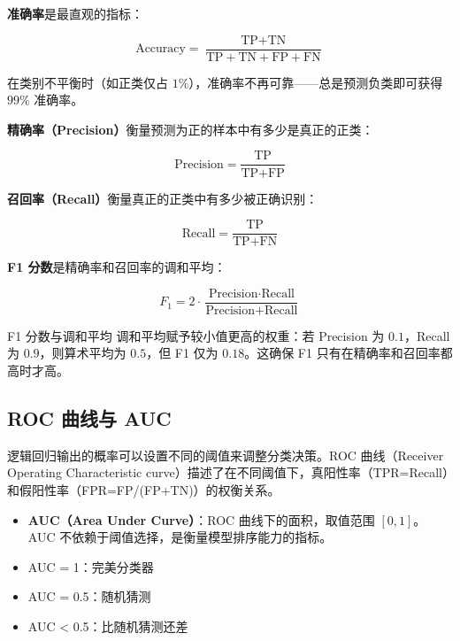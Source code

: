 \textbf{准确率}是最直观的指标：

\[
\text{Accuracy} = \frac{\text{TP} + \text{TN}}{\text{TP} + \text{TN} + \text{FP} + \text{FN}}
\]

在类别不平衡时（如正类仅占 $1\%$），准确率不再可靠——总是预测负类即可获得 $99\%$ 准确率。

\textbf{精确率（Precision）}衡量预测为正的样本中有多少是真正的正类：

\[
\text{Precision} = \frac{\text{TP}}{\text{TP} + \text{FP}}
\]

\textbf{召回率（Recall）}衡量真正的正类中有多少被正确识别：

\[
\text{Recall} = \frac{\text{TP}}{\text{TP} + \text{FN}}
\]

\textbf{F1 分数}是精确率和召回率的调和平均：

\[
F_1 = 2 \cdot \frac{\text{Precision} \cdot \text{Recall}}{\text{Precision} + \text{Recall}}
\]

\begin{myTheorem}{F1 分数与调和平均}
调和平均赋予较小值更高的权重：若 Precision 为 $0.1$，Recall 为 $0.9$，则算术平均为 $0.5$，但 F1 仅为 $0.18$。这确保 F1 只有在精确率和召回率都高时才高。
\end{myTheorem}

\subsection{ROC 曲线与 AUC}

逻辑回归输出的概率可以设置不同的阈值来调整分类决策。ROC 曲线（Receiver Operating Characteristic curve）描述了在不同阈值下，真阳性率（TPR=Recall）和假阳性率（FPR=FP/(FP+TN)）的权衡关系。

\begin{itemize}
    \item \textbf{AUC（Area Under Curve）}：ROC 曲线下的面积，取值范围 $[0,1]$。AUC 不依赖于阈值选择，是衡量模型排序能力的指标。
    \item AUC = 1：完美分类器
    \item AUC = 0.5：随机猜测
    \item AUC < 0.5：比随机猜测还差
\end{itemize}

